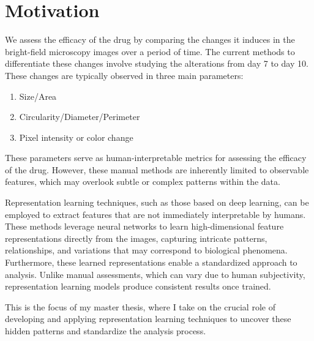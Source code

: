 \chapter{Motivation} \label{chapter:Motivation} 

We assess the efficacy of the drug by comparing the changes it induces in the bright-field microscopy images over a period of time. 
The current methods to differentiate these changes involve studying the alterations from day 7 to day 10. These changes are typically
observed in three main parameters: 

\begin{enumerate}
  \item Size/Area
  \item Circularity/Diameter/Perimeter
  \item Pixel intensity or color change
\end{enumerate}

These parameters serve as human-interpretable metrics for assessing the efficacy of the drug. However, these manual methods are inherently limited to
observable features, which may overlook subtle or complex patterns within the data.


Representation learning techniques, such as those based on deep learning, can be employed to extract features that are not immediately interpretable by 
humans. These methods leverage neural networks to learn high-dimensional feature representations directly from the images, capturing intricate patterns, 
relationships, and variations that may correspond to biological phenomena. Furthermore, these learned representations enable a standardized approach to analysis. Unlike manual assessments, which can vary due to human subjectivity,
representation learning models produce consistent results once trained. 

This is the focus of my master thesis, where I take on the crucial role of developing and applying representation learning techniques to uncover these
hidden patterns and standardize the analysis process.

\let\cleardoublepage\clearpage

